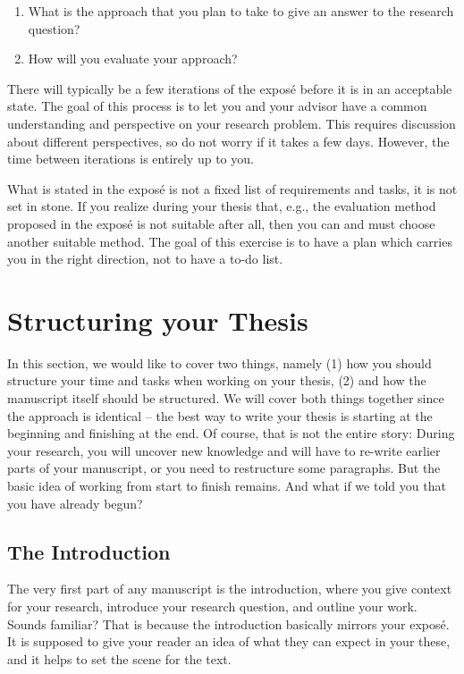 \documentclass[a4paper]{article}
\begin{document}
\begin{enumerate}
    \item What is the approach that you plan to take to give an answer to the research question?
    \item How will you evaluate your approach?
\end{enumerate}

There will typically be a few iterations of the expos\'e before it is in an acceptable state.
The goal of this process is to let you and your advisor have a common understanding and perspective on your research problem.
This requires discussion about different perspectives, so do not worry if it takes a few days.
However, the time between iterations is entirely up to you.

What is stated in the expos\'e is not a fixed list of requirements and tasks, it is not set in stone.
If you realize during your thesis that, e.g., the evaluation method proposed in the expos\'e is not suitable after all, then you can and must choose another suitable method.
The goal of this exercise is to have a plan which carries you in the right direction, not to have a to-do list.

\section{Structuring your Thesis}
\label{sec:structure}

In this section, we would like to cover two things, namely (1) how you should structure your time and tasks when working on your thesis, (2) and how the manuscript itself should be structured.
We will cover both things together since the approach is identical -- the best way to write your thesis is starting at the beginning and finishing at the end.
Of course, that is not the entire story: During your research, you will uncover new knowledge and will have to re-write earlier parts of your manuscript, or you need to restructure some paragraphs.
But the basic idea of working from start to finish remains.
And what if we told you that you have already begun?

\subsection{The Introduction}

The very first part of any manuscript is the introduction, where you give context for your research, introduce your research question, and outline your work.
Sounds familiar?
That is because the introduction basically mirrors your expos\'e.
It is supposed to give your reader an idea of what they can expect in your these, and it helps to set the scene for the text.
\end{document}
